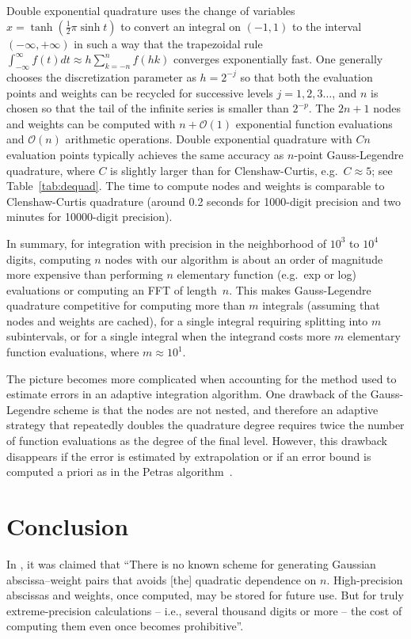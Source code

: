 \documentclass{siamart0216}
\newcommand{\OO}{\mathcal{O}}
\begin{document}
Double exponential quadrature uses the change of variables
$x = \tanh(\tfrac12 \pi \sinh t)$ to convert an integral on $(-1,1)$
to the interval $(-\infty,+\infty)$ in such a way that
the trapezoidal rule $\int_{-\infty}^{\infty} f(t) dt \approx h \sum_{k=-n}^{n} f(hk)$
converges exponentially fast.
One generally chooses the discretization parameter as $h = 2^{-j}$ so that
both the evaluation points and weights can be recycled for successive levels
$j = 1, 2, 3\ldots$, and $n$ is chosen so that the tail of the
infinite series is smaller than $2^{-p}$.
The $2n+1$ nodes and weights can be computed with $n + \OO(1)$
exponential function evaluations and $\OO(n)$ arithmetic operations.
Double exponential quadrature with $Cn$ evaluation points
typically achieves the same accuracy as $n$-point Gauss-Legendre quadrature,
where $C$ is slightly larger than
for Clenshaw-Curtis, e.g.\ $C \approx 5$; see Table~\ref{tab:dequad}.
The time to compute nodes and weights is comparable
to Clenshaw-Curtis quadrature (around 0.2 seconds for 1000-digit
precision and two minutes for 10000-digit precision).

In summary, for integration
with precision in the neighborhood of $10^3$ to $10^4$ digits,
computing $n$ nodes with our algorithm is about an
order of magnitude more expensive than performing $n$ elementary function (e.g.\ exp or log)
evaluations or computing an FFT of length~$n$.
This makes Gauss-Legendre quadrature competitive for computing more than $m$
integrals (assuming that nodes and weights are cached),
for a single integral requiring splitting into $m$ subintervals,
or for a single integral when the integrand costs more $m$ elementary
function evaluations, where $m \approx 10^1$.

The picture becomes more complicated when accounting for the method
used to estimate errors in an adaptive integration algorithm.
One drawback of the Gauss-Legendre scheme is that the nodes
are not nested, and therefore an adaptive strategy that
repeatedly doubles the quadrature degree
requires twice the number of function evaluations as
the degree of the final level.
However, this drawback disappears if the
error is estimated by extrapolation or if an error bound is computed
a priori as in the Petras algorithm~\cite{petras2002self}.

\section{Conclusion}

In \cite{bailey2011high}, it was claimed that
``There is no known scheme for generating Gaussian abscissa--weight pairs
that avoids [the] quadratic dependence
on $n$. High-precision abscissas
and weights, once computed, may be stored for future use. But for truly
extreme-precision calculations -- i.e., several thousand digits or
more -- the cost of computing them
even once becomes prohibitive''.
\end{document}
